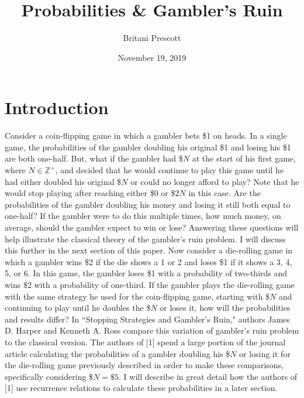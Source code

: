 \documentclass[12pt]{article}
\title{Probabilities \& Gambler's Ruin}
\author{Britani Prescott }
\date{November 19, 2019}
\begin{document}
\maketitle

\section{Introduction}
Consider a coin-flipping game in which a gambler bets \$1 on heads.
In a single game, the probabilities of the gambler doubling his original \$1 and losing his \$1 are both one-half.
But, what if the gambler had \$$N$ at the start of his first game, where $N \in \mathbb{Z}^{+}$, and decided that he would continue to play this game until he had either doubled his original \$$N$ or could no longer afford to play?
Note that he would stop playing after reaching either \$0 or \$$2N$ in this case.  
Are the probabilities of the gambler doubling his money and losing it still both equal to one-half?
If the gambler were to do this multiple times, how much money, on average, should the gambler expect to win or lose?
Answering these questions will help illustrate the classical theory of the gambler's ruin problem.
I will discuss this further in the next section of this paper.
\newline Now consider a die-rolling game in which a gambler wins \$2 if the die shows a 1 or 2 and loses \$1 if it shows a 3, 4, 5, or 6.
In this game, the gambler loses \$1 with a probability of two-thirds and wins \$2 with a probability of one-third.  
If the gambler plays the die-rolling game with the same strategy he used for the coin-flipping game, starting with \$$N$ and continuing to play until he doubles the \$$N$ or loses it, how will the probabilities and results differ?
In ``Stopping Strategies and Gambler's Ruin," authors James D. Harper and Kenneth A. Ross compare this variation of gambler's ruin problem to the classical version.
The authors of [1] spend a large portion of the journal article calculating the probabilities of a gambler doubling his \$$N$ or losing it for the die-rolling game previously described in order to make these comparisons, specifically considering \$$N = \$5$.
I will describe in great detail how the authors of [1] use recurrence relations to calculate these probabilities in a later section.
\end{document}

